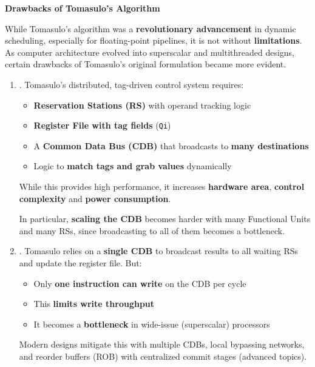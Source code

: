 \begin{flushleft}
    \textcolor{Red2}{ \textbf{Drawbacks of Tomasulo's Algorithm}}
\end{flushleft}
While Tomasulo's algorithm was a \textbf{revolutionary advancement} in dynamic scheduling, especially for floating-point pipelines, it is not without \textbf{limitations}. As computer architecture evolved into superscalar and multithreaded designs, certain drawbacks of Tomasulo's original formulation became more evident.
\begin{enumerate}
    \item {}. Tomasulo's distributed, tag-driven control system requires:
    \begin{itemize}
        \item \textbf{Reservation Stations (RS)} with operand tracking logic
        \item \textbf{Register File with tag fields} (\texttt{Qi})
        \item A \textbf{Common Data Bus (CDB)} that broadcasts to \textbf{many destinations}
        \item Logic to \textbf{match tags and grab values} dynamically
    \end{itemize}
    While this provides high performance, it increases \textbf{hardware area}, \textbf{control complexity} and \textbf{power consumption}.
    
    In particular, \textbf{scaling the CDB} becomes harder with many Functional Units and many RSs, since broadcasting to all of them becomes a bottleneck.


    \item {}. Tomasulo relies on a \textbf{single CDB} to broadcast results to all waiting RSs and update the register file. But:
    \begin{itemize}
        \item Only \textbf{one instruction can write} on the CDB per cycle
        \item This \textbf{limits write throughput}
        \item It becomes a \textbf{bottleneck} in wide-issue (superscalar) processors
    \end{itemize}
    Modern designs mitigate this with multiple CDBs, local bypassing networks, and reorder buffers (ROB) with centralized commit stages (advanced topics).
    

\end{enumerate}

